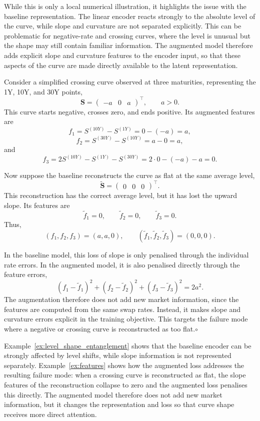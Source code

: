 While this is only a local numerical illustration, it highlights the issue with the baseline representation. The linear encoder reacts strongly to the absolute level of the curve, while slope and curvature are not separated explicitly. This can be problematic for negative-rate and crossing curves, where the level is unusual but the shape may still contain familiar information. The augmented model therefore adds explicit slope and curvature features to the encoder input, so that these aspects of the curve are made directly available to the latent representation.

\begin{example}\label{ex:features}
Consider a simplified crossing curve observed at three maturities, representing the 1Y, 10Y, and 30Y points,
\[
\mathbf S
=
\begin{pmatrix}
-a & 0 & a
\end{pmatrix}^{\top},
\qquad a>0.
\]
This curve starts negative, crosses zero, and ends positive. Its augmented features are
\[
f_1 = S^{(10Y)}-S^{(1Y)} = 0-(-a)=a,
\]
\[
f_2 = S^{(30Y)}-S^{(10Y)} = a-0=a,
\]
and
\[
f_3 = 2S^{(10Y)}-S^{(1Y)}-S^{(30Y)}
=
2\cdot 0-(-a)-a
=
0.
\]

Now suppose the baseline reconstructs the curve as flat at the same average level,
\[
\widetilde{\mathbf S}
=
\begin{pmatrix}
0 & 0 & 0
\end{pmatrix}^{\top}.
\]
This reconstruction has the correct average level, but it has lost the upward slope. Its features are
\[
\widetilde f_1 = 0,
\qquad
\widetilde f_2 = 0,
\qquad
\widetilde f_3 = 0.
\]
Thus,
\[
(f_1,f_2,f_3)=(a,a,0),
\qquad
(\widetilde f_1,\widetilde f_2,\widetilde f_3)=(0,0,0).
\]

In the baseline model, this loss of slope is only penalised through the individual rate errors. In the augmented model, it is also penalised directly through the feature errors,
\[
(f_1-\widetilde f_1)^2
+
(f_2-\widetilde f_2)^2
+
(f_3-\widetilde f_3)^2
=
2a^2.
\]
The augmentation therefore does not add new market information, since the features are computed from the same swap rates. Instead, it makes slope and curvature errors explicit in the training objective. This targets the failure mode where a negative or crossing curve is reconstructed as too flat.\;\;\(\circ\)
\end{example}

Example~\ref{ex:level_shape_entanglement} shows that the baseline encoder can be strongly affected by level shifts, while slope information is not represented separately. Example~\ref{ex:features} shows how the augmented loss addresses the resulting failure mode: when a crossing curve is reconstructed as flat, the slope features of the reconstruction collapse to zero and the augmented loss penalises this directly. The augmented model therefore does not add new market information, but it changes the representation and loss so that curve shape receives more direct attention.




